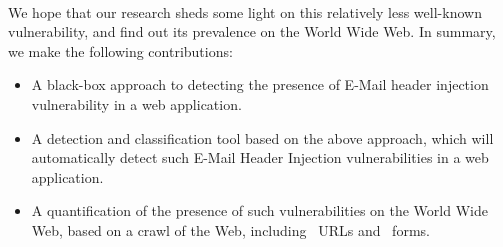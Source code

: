 \paragraph{} %
We hope that our research sheds some light on this relatively less well-known vulnerability, and find out its prevalence on the World Wide Web. In summary, we make the following contributions:
\begin{itemize}
	
	\item{A black-box approach to detecting the presence of E-Mail header injection vulnerability in a web application.}
	
	\item{A detection and classification tool based on the above approach, which will automatically detect such E-Mail Header Injection vulnerabilities in a web application.}
	
	\item{A quantification of the presence of such vulnerabilities on the World Wide Web, based on a crawl of the Web, including \urls\ URLs and \forms\ forms.}
	
\end{itemize}

\paragraph{}